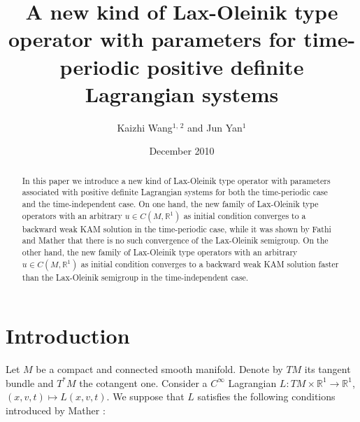 \documentclass{amsart}[12pt]
\theoremstyle{definition}
\theoremstyle{remark}
\numberwithin{equation}{section}
\begin{document}
\title[]{A new kind of Lax-Oleinik type operator with parameters for time-periodic positive definite Lagrangian systems}

\author[K. Wang and J. Yan]{Kaizhi Wang$^{1,\,2}$ and Jun Yan$^{1}$}
\address{$^{1}$ School of Mathematical Sciences
and Key Lab of Mathematics for Nonlinear Science, Fudan
University, Shanghai 200433, China}

\address{$^{2}$ College of Mathematics,
Jilin University,  Changchun 130012, China}


\date{December 2010}

\begin{abstract}
In this paper we introduce a new kind of Lax-Oleinik type operator
with parameters associated with positive definite Lagrangian
systems for both the time-periodic case and the time-independent
case. On one hand, the new family of Lax-Oleinik type operators
with an arbitrary $u\in C(M,\mathbb{R}^1)$ as initial condition
converges to a backward weak KAM solution in the time-periodic
case, while it was shown by Fathi and Mather that there is no such
convergence of the Lax-Oleinik semigroup. On the other hand, the
new family of Lax-Oleinik type operators with an arbitrary $u\in
C(M,\mathbb{R}^1)$ as initial condition converges to a backward
weak KAM solution faster than the Lax-Oleinik semigroup in the
time-independent case.
\end{abstract}

\maketitle

\section{Introduction}
Let $M$ be a compact and connected smooth manifold. Denote by $TM$
its tangent bundle and $T^*M$ the cotangent one. Consider a
$C^\infty$ Lagrangian $L: TM\times\mathbb{R}^1\to\mathbb{R}^1$,
$(x,v,t)\mapsto L(x,v,t)$. We suppose that $L$ satisfies the
following conditions introduced by Mather \cite{Mat91}:
\end{document}
